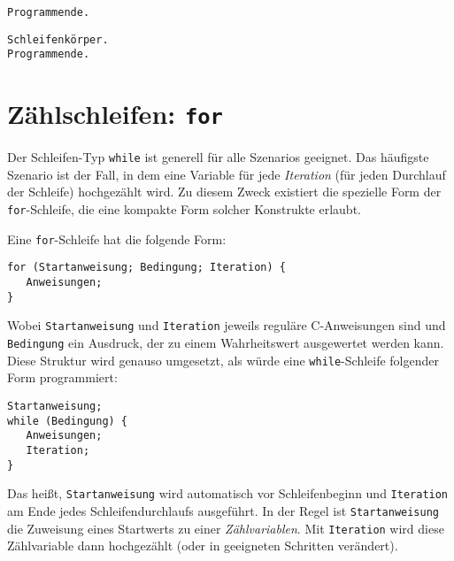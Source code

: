 \begin{tcbraster}[raster columns=2,
                  raster equal height,
                  nobeforeafter,
                  raster column skip=0.5cm]
\begin{cmdbox}
\begin{verbatim}
Programmende.
\end{verbatim}
\end{cmdbox}
%
\begin{cmdbox}
\begin{verbatim}
Schleifenkörper.
Programmende.
\end{verbatim}
\end{cmdbox}
\end{tcbraster}

\section{Zählschleifen: \texttt{for}}
Der Schleifen-Typ \texttt{while} ist generell für alle Szenarios geeignet. Das häufigste Szenario ist der Fall, in dem eine Variable für jede \emph{Iteration} (\ie für jeden Durchlauf der Schleife) hochgezählt wird. Zu diesem Zweck existiert die spezielle Form der \texttt{for}-Schleife, die eine kompakte Form solcher Konstrukte erlaubt.

Eine \texttt{for}-Schleife hat die folgende Form:
\begin{codebox}
\begin{verbatim}
for (Startanweisung; Bedingung; Iteration) {
   Anweisungen;
}
\end{verbatim}
\end{codebox}

Wobei \texttt{Startanweisung} und \texttt{Iteration} jeweils reguläre C-Anweisungen sind und \texttt{Bedingung} ein Ausdruck, der zu einem Wahrheitswert ausgewertet werden kann. Diese Struktur wird genauso umgesetzt, als würde eine \texttt{while}-Schleife folgender Form programmiert:

\begin{codebox}
\begin{verbatim}
Startanweisung;
while (Bedingung) {
   Anweisungen;
   Iteration;
}
\end{verbatim}
\end{codebox}

Das heißt, \texttt{Startanweisung} wird automatisch vor Schleifenbeginn und \texttt{Iteration} am Ende jedes Schleifendurchlaufs ausgeführt. In der Regel ist \texttt{Startanweisung} die Zuweisung eines Startwerts zu einer \emph{Zählvariablen}. Mit \texttt{Iteration} wird diese Zählvariable dann hochgezählt (oder in geeigneten Schritten verändert).


